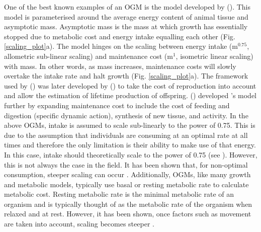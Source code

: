 \documentclass[a4paper, 11pt, hidelinks]{article} %
\begin{document}
	One of the best known examples of an OGM is the model developed by \citeauthor{West2001} (\citeyear{West2001}).  This model is parameterised around the average energy content of animal tissue and asymptotic mass.  Asymptotic mass is the mass at which growth has essentially stopped due to metabolic cost and energy intake equalling each other (Fig. \ref{scaling_plot}a). The model hinges on the scaling between energy intake (m$^{0.75}$, allometric sub-linear scaling) and maintenance cost (m$^1$, isometric linear scaling) with mass.  In other words, as mass increases, maintenance costs will slowly overtake the intake rate and halt growth (Fig. \ref{scaling_plot}a).  	
	The framework used by \citeauthor{West2001} (\citeyear{West2001}) was later developed by \citeauthor{Charnov2001} (\citeyear{Charnov2001}) to take the cost of reproduction into account and allow the estimation of lifetime production of offspring.  \citeauthor{Hou2008} (\citeyear{Hou2008})  developed \citeauthor{West2001}'s model further by expanding maintenance cost to include the cost of feeding and digestion (specific dynamic action), synthesis of new tissue, and activity.
	In the above OGMs, intake is assumed to scale sub-linearly to the power of 0.75.  This is due to the assumption that individuals are consuming at an optimal rate at all times and therefore the only limitation is their ability to make use of that energy.  In this case, intake should theoretically scale to the power of 0.75 (see \cite{West1997}).  However, this is not always the case in the field.  It has been shown that, for non-optimal consumption, steeper scaling can occur \parencite{Peters1983, Pawar2012}. Additionally, OGMs, like many growth and metabolic models, typically use basal or resting metabolic rate to calculate metabolic cost.  Resting metabolic rate is the minimal metabolic rate of an organism and is typically thought of as the metabolic rate of the organism when relaxed and at rest.  However, it has been shown, once factors such as movement are taken into account, scaling becomes steeper \parencite{Weibel2004}.
	
\end{document}
